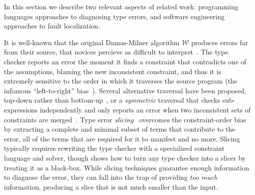 \label{sec:related-work}
\label{sec:type-error-diagnosis}

In this section we describe two relevant aspects of related work:
%
programming languages approaches to diagnosing type errors, and
%
software engineering approaches to fault localization.
%
%
%

It is well-known that the original Damas-Milner
algorithm $\mathcal{W}$ produces errors far
from their source, that novices percieve as
difficult to interpret~\citep{Wand1986-nw}.
%
%
The type checker reports an error the moment
it finds a constraint that contradicts one
of the assumptions, blaming the new inconsistent
constraint, and thus it is extremely sensitive
to the order in which it traverses the source
program (the infamous ``left-to-right''
bias~\citep{McAdam1998-ub}).
%
Several alternative traversal have been proposed,
\eg top-down rather than bottom-up~\citep{Lee1998-ys},
or a \emph{symmetric} traversal that checks
sub-expressions independently and only reports an
error when two inconsistent sets of constraints are
merged~\citep{McAdam1998-ub,Yang1999-yr}.
%
Type error \emph{slicing}~\citep{Haack2003-vc,Tip2001-qp,Rahli2010-ps}
overcomes the constraint-order bias by extracting a
complete and minimal subset
of terms that contribute to the error, \ie all of the
terms that are required for it to manifest and no more.
%
Slicing typically requires rewriting the type checker with a
specialized constraint language and solver, though
\citet{Schilling2011-yf} shows how to turn any type checker into a
slicer by treating it as a black-box.
%
While slicing techniques guarantee enough information to diagnose the
error, they can fall into the trap of providing \emph{too much}
information, producing a slice that is not much smaller than
the input. %

